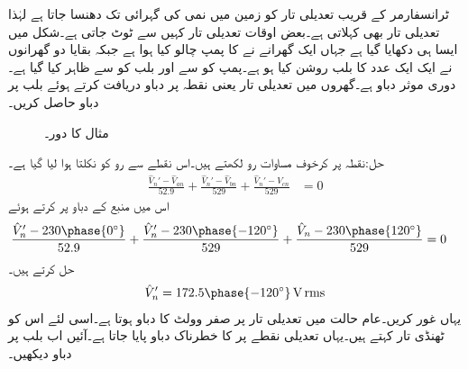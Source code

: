 ٹرانسفارمر کے قریب تعدیلی تار کو زمین میں نمی کی گہرائی تک دھنسا جاتا ہے لہٰذا تعدیلی تار  بھی کہلاتی ہے۔بعض اوقات تعدیلی تار کہیں سے ٹوٹ جاتی ہے۔شکل  میں ایسا ہی دکھایا گیا ہے جہاں ایک گھرانے نے  کا پمپ چالو کیا ہوا ہے جبکہ بقایا دو گھرانوں نے ایک ایک عدد  کا بلب روشن کیا ہو ہے۔پمپ کو  سے اور بلب کو  سے ظاہر کیا گیا ہے۔دوری موثر دباو  ہے۔گھروں میں تعدیلی تار یعنی نقطہ  پر دباو دریافت کرتے ہوئے بلب پر دباو حاصل کریں۔
 \begin{figure}
\centering
{}
\caption{مثال  کا دور۔}
\label{شکل_تین_دوری_تعدیلی_تار_غیر_موجود}
\end{figure}

حل:نقطہ  پر کرخوف مساوات رو لکھتے ہیں۔اس نقطے سے رو کو نکلتا ہوا لیا گیا ہے۔ 
\begin{align*}
\frac{\hat{V}_n'-\hat{V}_{an}}{52.9}+\frac{\hat{V}_n'-\hat{V}_{bn}}{529}+\frac{\hat{V}_n'-\hat{V}_{cn}}{529}&=0
\end{align*} 
اس میں منبع کے دباو پر کرتے ہوئے
\begin{align*}
\frac{\hat{V}_n'-230\phase{0^{\circ}}}{52.9}+\frac{\hat{V}_n'-230\phase{-120^{\circ}}}{529}+\frac{\hat{V}_n-230\phase{120^{\circ}}}{529}&=0
\end{align*} 
حل کرتے ہیں۔
\begin{align*}
\hat{V}_n'=172.5\phase{-120^{\circ}}\,\si{\volt}\,\rms
\end{align*}
یہاں غور کریں۔عام حالت میں تعدیلی تار پر صفر وولٹ کا دباو ہوتا ہے۔اسی لئے اس کو ٹھنڈی تار کہتے ہیں۔یہاں تعدیلی نقطے پر  کا خطرناک دباو پایا جاتا ہے۔آئیں اب بلب پر دباو دیکھیں۔

